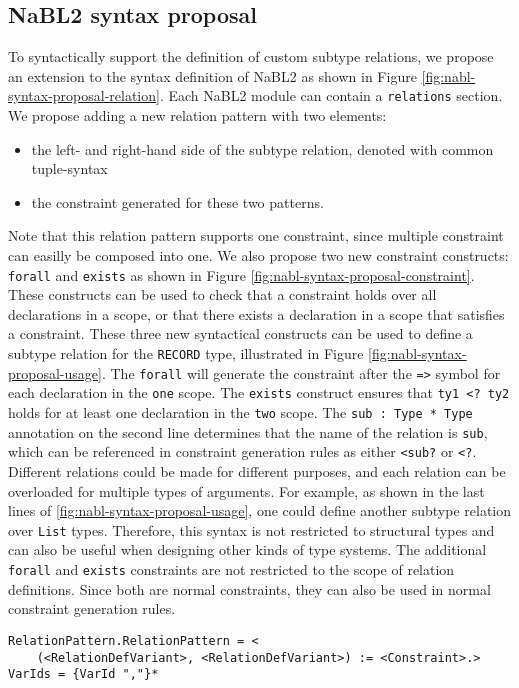 \subsection{NaBL2 syntax proposal}
To syntactically support the definition of custom subtype relations, 
we propose an extension to the syntax definition of NaBL2 as shown in Figure \ref{fig:nabl-syntax-proposal-relation}.
Each NaBL2 module can contain a \texttt{relations} section.
We propose adding a new relation pattern with two elements: 
\begin{itemize}
\item the left- and right-hand side of the subtype relation, denoted with common tuple-syntax
\item the constraint generated for these two patterns.
\end{itemize}
Note that this relation pattern supports one constraint, 
since multiple constraint can easilly be composed into one.
We also propose two new constraint constructs: \texttt{forall} and \texttt{exists} as shown in Figure \ref{fig:nabl-syntax-proposal-constraint}.
These constructs can be used to check that a constraint holds over all declarations in a scope, 
or that there exists a declaration in a scope that satisfies a constraint.
These three new syntactical constructs can be used to define a subtype relation for the \texttt{RECORD} type,
illustrated in Figure \ref{fig:nabl-syntax-proposal-usage}.
The \texttt{forall} will generate the constraint after the \texttt{=>} symbol for each declaration in the \texttt{one} scope.
The \texttt{exists} construct ensures that \texttt{ty1 <? ty2} holds for at least one declaration in the \texttt{two} scope.
The \texttt{sub : Type * Type} annotation on the second line determines that the name of the relation is \texttt{sub},
which can be referenced in constraint generation rules as either \texttt{<sub?} or \texttt{<?}.
Different relations could be made for different purposes, and each relation can be overloaded for multiple types of arguments.
For example, as shown in the last lines of \ref{fig:nabl-syntax-proposal-usage}, one could define another subtype relation over \texttt{List} types.
Therefore, this syntax is not restricted to structural types and can also be useful when designing other kinds of type systems.
The additional \texttt{forall} and \texttt{exists} constraints are not restricted to the scope of relation definitions.
Since both are normal constraints, they can also be used in normal constraint generation rules.

\begin{figure*}
\begin{lstlisting}
RelationPattern.RelationPattern = <
	(<RelationDefVariant>, <RelationDefVariant>) := <Constraint>.>
VarIds = {VarId ","}*
\end{lstlisting}
\caption{The syntax proposal for NaBL2 relation definitions.}
\label{fig:nabl-syntax-proposal-relation}
\end{figure*}

